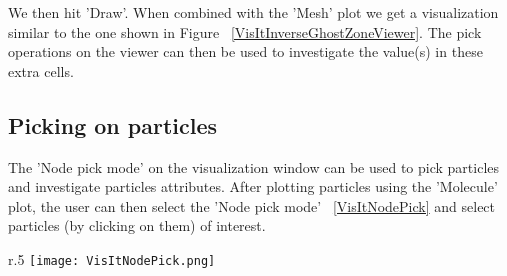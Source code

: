 
We then hit 'Draw'. When combined with the 'Mesh' plot we get a visualization similar to the one shown in Figure ~\ref{VisItInverseGhostZoneViewer}. The pick operations on the viewer can then be used to investigate the value(s) in these extra cells.


\begin{figure}[h]
  \centering
 \vspace{5pt}
  \hspace{20pt}
 \hspace{20pt}
  \caption{}
 \vspace{-10pt}
  \label{}
\end{figure}


\subsection{Picking on particles}

The 'Node pick mode' on the visualization window can be used to pick
particles and investigate particles attributes. After plotting
particles using the 'Molecule' plot, the user can then select the
'Node pick mode' ~\ref{VisItNodePick} and select particles (by
clicking on them) of interest.

 \begin{wrapfigure}{r}{.5\textwidth}
   \center
   \texttt{[image: VisItNodePick.png]}
   \caption{The 'Node pick mode' on the visualization window}
   \label{VisItNodePick}
 \end{wrapfigure}

